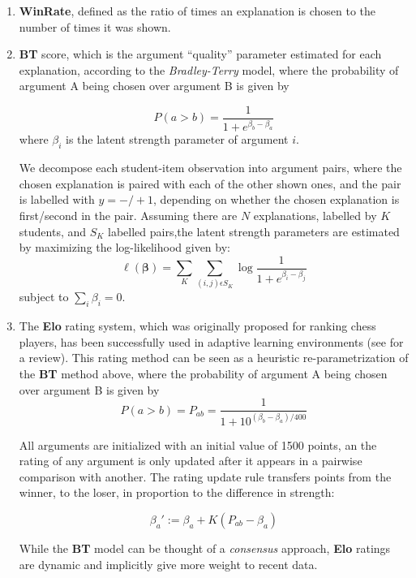 \documentclass[notitlepage,12pt]{jedm}
\begin{document}
\begin{enumerate}
	
	\item \textbf{WinRate}, defined as the ratio of times an explanation is 
	chosen to the number of times it was shown.
	
	\item \textbf{BT} score, which is the argument ``quality'' parameter 
	estimated for each explanation, according to the \textit{Bradley-Terry} 
	model, where the probability of argument A being chosen over argument B is 
	given by 
	
	$$
	P(a>b) = 
	\frac{1}{1+e^{\beta_b-\beta_a}}
	$$
	where $\beta_i$ is the latent strength parameter of argument $i$. 
	
	We decompose each student-item observation into argument pairs, where the 
	chosen explanation is paired with each of the other shown ones, and the 
	pair is labelled with $y=-/+1$, depending on whether the chosen explanation 
	is first/second in the pair.
	Assuming there are $N$ explanations, labelled by $K$ students, and $S_K$ 
	labelled pairs,the latent strength parameters are estimated by maximizing 
	the log-likelihood given by:
	$$
	\ell(\boldsymbol{\beta})=\sum_{K}\sum_{(i,j)\epsilon S_K}^{} 
	\log\frac{1}{1+e^{\beta_i - \beta_j}}
	$$
	subject to $\sum_{i}\beta_i=0$.
	
	
	\item The \textbf{Elo} rating system\cite{elo_rating_1978}, which was 
	originally proposed for ranking chess players, has been successfully used 
	in adaptive learning environments (see \cite{pelanek_applications_2016} for 
	a review). 
	This rating method can be seen as a heuristic re-parametrization of the 
	\textbf{BT} method above, where the probability of argument A being chosen 
	over argument B is given by
	$$
	P(a>b) = P_{ab} = \frac{1}{1+10^{(\beta_b-\beta_a)/400}}
	$$
	
	All arguments are initialized with an initial value of 1500 points, an the 
	rating of any argument is only updated after it appears in a pairwise 
	comparison with another.
	The rating update rule transfers points from the winner, to the loser, in 
	proportion to the difference in strength:
	
	$$
	\beta_a':=\beta_a+K(P_{ab} - \beta_a)
	$$
	
	While the \textbf{BT} model can be thought of a \textit{consensus} 
	approach, \textbf{Elo} ratings are dynamic and implicitly give more weight 
	to recent data\cite{aldous_elo_2017}.
	

\end{enumerate}
\end{document}
